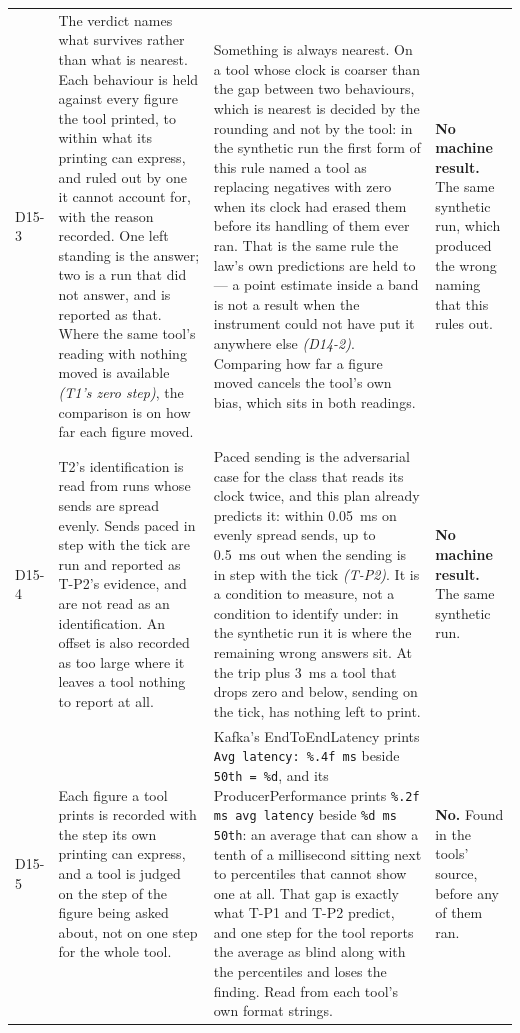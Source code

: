 \documentclass[11pt]{article}
\newcommand{\gl}[1]{{\color{soft}\itshape\small (#1)}}
\begin{document}
{\begin{longtable}{@{}p{1.1cm} >{\raggedright\arraybackslash}p{6.1cm} >{\raggedright\arraybackslash}p{6.0cm} >{\raggedright\arraybackslash}p{2.2cm}@{}}
D15-3 & The verdict names what survives rather than what is nearest. Each behaviour is held against every figure the tool printed, to within what its printing can express, and ruled out by one it cannot account for, with the reason recorded. One left standing is the answer; two is a run that did not answer, and is reported as that. Where the same tool's reading with nothing moved is available \gl{T1's zero step}, the comparison is on how far each figure moved. & Something is always nearest. On a tool whose clock is coarser than the gap between two behaviours, which is nearest is decided by the rounding and not by the tool: in the synthetic run the first form of this rule named a tool as replacing negatives with zero when its clock had erased them before its handling of them ever ran. That is the same rule the law's own predictions are held to --- a point estimate inside a band is not a result when the instrument could not have put it anywhere else \gl{D14-2}. Comparing how far a figure moved cancels the tool's own bias, which sits in both readings. & \textbf{No machine result.} The same synthetic run, which produced the wrong naming that this rules out. \\
D15-4 & T2's identification is read from runs whose sends are spread evenly. Sends paced in step with the tick are run and reported as T-P2's evidence, and are not read as an identification. An offset is also recorded as too large where it leaves a tool nothing to report at all. & Paced sending is the adversarial case for the class that reads its clock twice, and this plan already predicts it: within 0.05~ms on evenly spread sends, up to 0.5~ms out when the sending is in step with the tick \gl{T-P2}. It is a condition to measure, not a condition to identify under: in the synthetic run it is where the remaining wrong answers sit. At the trip plus 3~ms a tool that drops zero and below, sending on the tick, has nothing left to print. & \textbf{No machine result.} The same synthetic run. \\
D15-5 & Each figure a tool prints is recorded with the step its own printing can express, and a tool is judged on the step of the figure being asked about, not on one step for the whole tool. & Kafka's EndToEndLatency prints \texttt{Avg latency: \%.4f ms} beside \texttt{50th = \%d}, and its ProducerPerformance prints \texttt{\%.2f ms avg latency} beside \texttt{\%d ms 50th}: an average that can show a tenth of a millisecond sitting next to percentiles that cannot show one at all. That gap is exactly what T-P1 and T-P2 predict, and one step for the tool reports the average as blind along with the percentiles and loses the finding. Read from each tool's own format strings. & \textbf{No.} Found in the tools' source, before any of them ran. \\

\end{longtable}}
\end{document}
